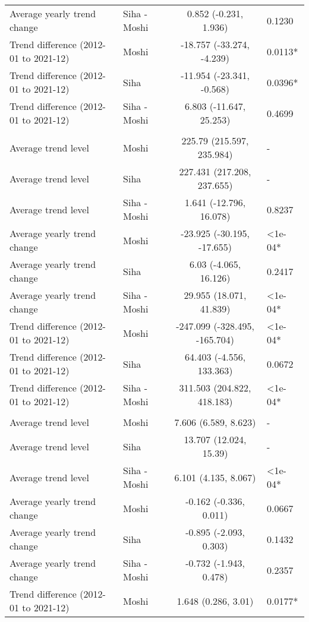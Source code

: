\begin{longtable}{l|lcl}
Average yearly trend change & Siha - Moshi & 0.852 (-0.231, 1.936) & 0.1230 \\ 
Trend difference (2012-01 to 2021-12) & Moshi & -18.757 (-33.274, -4.239) & 0.0113* \\ 
Trend difference (2012-01 to 2021-12) & Siha & -11.954 (-23.341, -0.568) & 0.0396* \\ 
Trend difference (2012-01 to 2021-12) & Siha - Moshi & 6.803 (-11.647, 25.253) & 0.4699 \\ 
\midrule\addlinespace[2.5pt]
\multicolumn{4}{l}{Skin Infection - Fungal} \\[2.5pt] 
\midrule\addlinespace[2.5pt]
Average trend level & Moshi & 225.79 (215.597, 235.984) & - \\ 
Average trend level & Siha & 227.431 (217.208, 237.655) & - \\ 
Average trend level & Siha - Moshi & 1.641 (-12.796, 16.078) & 0.8237 \\ 
Average yearly trend change & Moshi & -23.925 (-30.195, -17.655) & <1e-04* \\ 
Average yearly trend change & Siha & 6.03 (-4.065, 16.126) & 0.2417 \\ 
Average yearly trend change & Siha - Moshi & 29.955 (18.071, 41.839) & <1e-04* \\ 
Trend difference (2012-01 to 2021-12) & Moshi & -247.099 (-328.495, -165.704) & <1e-04* \\ 
Trend difference (2012-01 to 2021-12) & Siha & 64.403 (-4.556, 133.363) & 0.0672 \\ 
Trend difference (2012-01 to 2021-12) & Siha - Moshi & 311.503 (204.822, 418.183) & <1e-04* \\ 
\midrule\addlinespace[2.5pt]
\multicolumn{4}{l}{Snake and Insect Bites} \\[2.5pt] 
\midrule\addlinespace[2.5pt]
Average trend level & Moshi & 7.606 (6.589, 8.623) & - \\ 
Average trend level & Siha & 13.707 (12.024, 15.39) & - \\ 
Average trend level & Siha - Moshi & 6.101 (4.135, 8.067) & <1e-04* \\ 
Average yearly trend change & Moshi & -0.162 (-0.336, 0.011) & 0.0667 \\ 
Average yearly trend change & Siha & -0.895 (-2.093, 0.303) & 0.1432 \\ 
Average yearly trend change & Siha - Moshi & -0.732 (-1.943, 0.478) & 0.2357 \\ 
Trend difference (2012-01 to 2021-12) & Moshi & 1.648 (0.286, 3.01) & 0.0177* \\ 

\end{longtable}
